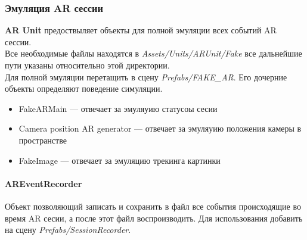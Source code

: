 \documentclass[a4paper, 11pt, titlepage]{article}
\begin{document}
      \subsubsection{Эмуляция AR сессии}
        \textbf{AR Unit} предоствыляет объекты для полной эмуляции всех событий AR сессии.\\
        Все необходимые файлы находятся в \textit{Assets/Units/ARUnit/Fake} все дальнейшие пути указаны относительно этой директории.\\
        Для полной эмуляции перетащить в сцену \textit{Prefabs/FAKE\_AR}. Его дочерние объекты определяют поведение симуляции.
        \begin{itemize}
          \item FakeARMain --- отвечает за эмуляуию статусоы сесии
          \item Camera position AR generator --- отвечает за эмуляуию положения камеры в пространстве
          \item FakeImage --- отвечает за эмуляцию трекинга картинки
        \end{itemize} 

      \paragraph{AREventRecorder}
        Объект позволяющий записать и сохранить в файл все события происходящие во время AR сесии, а после 
        этот файл воспроизводить.
        Для использования добавить на сцену \textit{Prefabs/SessionRecorder}.
\end{document}
